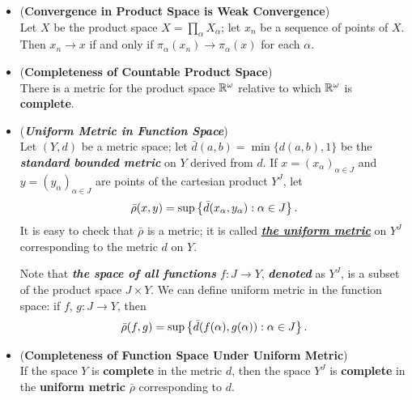 \documentclass[11pt]{article}
\begin{document}
\begin{itemize}
\item \begin{lemma} (\textbf{Convergence in Product Space is Weak Convergence}) \citep{munkres2000topology} \\
Let $X$ be the product space $X = \prod_{\alpha}X_{\alpha}$; let $x_n$ be a sequence of points of $X$. Then $x_n \rightarrow x$ if and only if $\pi_{\alpha}(x_n) \rightarrow  \pi_{\alpha}(x)$ for each $\alpha$.
\end{lemma}

\item \begin{proposition} (\textbf{Completeness of Countable Product Space}) \citep{munkres2000topology} \\
There is a metric for the product space ${\mathbb R}^{\omega}$ relative to which ${\mathbb R}^{\omega}$ is \textbf{complete}.
\end{proposition}

\item \begin{definition} (\emph{\textbf{Uniform Metric in Function Space}})\\
Let $(Y, d)$ be a metric space; let $\bar{d}(a, b) = \min\{d(a, b), 1\}$ be the \emph{\textbf{standard bounded metric}} on $Y$ derived from $d$. If $x = (x_{\alpha})_{\alpha \in J}$ and  $y = (y_{\alpha})_{\alpha \in J}$ are points of the cartesian product $Y^J$, let
\begin{align*}
\bar{\rho}(x, y) = \sup\left\{\bar{d}(x_{\alpha}, y_{\alpha}): \alpha \in J\right\}.
\end{align*}
It is easy to check that $\bar{\rho}$ is a metric; it is called \underline{\emph{\textbf{the uniform metric}}} on $Y^J$ corresponding to the metric $d$ on $Y$.

Note that \emph{\textbf{the space of all functions} $f: J \rightarrow Y$}, \emph{\textbf{denoted}} as $Y^{J}$, is a subset of the product space $J \times Y$. We can define uniform metric in the function space: if $f$, $g : J \rightarrow Y$, then
\begin{align*}
\bar{\rho}(f, g) = \sup\left\{\bar{d}(f(\alpha), g(\alpha)): \alpha \in J\right\}.
\end{align*}
\end{definition}

\item \begin{proposition} (\textbf{Completeness of Function Space  Under Uniform Metric}) \citep{munkres2000topology} \\
If the space $Y$ is \textbf{complete} in the metric $d$, then the space $Y^J$ is \textbf{complete} in the \textbf{uniform metric} $\bar{\rho}$ corresponding to $d$.
\end{proposition}


\end{itemize}
\end{document}
